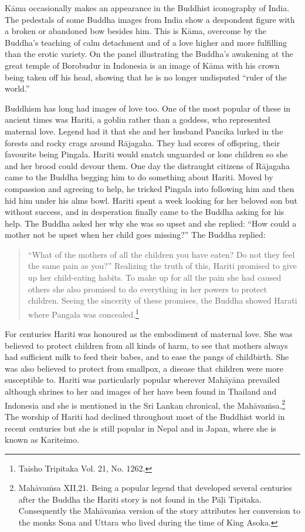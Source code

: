 \documentclass[10pt, openright]{book}
\begin{document}
Kāma occasionally makes an appearance in the Buddhist iconography of India. The pedestals of some Buddha images from India show a despondent figure with a broken or abandoned bow besides him. This is Kāma, overcome by the Buddha’s teaching of calm detachment and of a love higher and more fulfilling than the erotic variety. On the panel illustrating the Buddha’s awakening at the great temple of Borobudur in Indonesia is an image of Kāma with his crown being taken off his head, showing that he is no longer undisputed “ruler of the world.”


Buddhism has long had images of love too. One of the most popular of these in ancient times was Hariti, a goblin rather than a goddess, who represented maternal love. Legend had it that she and her husband Pancika lurked in the forests and rocky crags around Rājagaha. They had scores of offspring, their favourite being Pingala. Hariti would snatch unguarded or lone children so she and her brood could devour them. One day the distraught citizens of Rājagaha came to the Buddha begging him to do something about Hariti. Moved by compassion and agreeing to help, he tricked Pingala into following him and then hid him under his alms bowl. Hariti spent a week looking for her beloved son but without success, and in desperation finally came to the Buddha asking for his help. The Buddha asked her why she was so upset and she replied: “How could a mother not be upset when her child goes missing?” The Buddha replied:


\begin{quote}

\hspace{-0.4em}“What of the mothers of all the children you have eaten? Do not they feel the same pain as you?” Realizing the truth of this, Hariti promised to give up her child-eating habits. To make up for all the pain she had caused others she also promised to do everything in her powers to protect children. Seeing the sincerity of these promises, the Buddha showed Harati where Pangala was concealed.\footnote {Taisho Tripitaka Vol. 21, No. 1262.}


\end{quote}
For centuries Hariti was honoured as the embodiment of maternal love. She was believed to protect children from all kinds of harm, to see that mothers always had sufficient milk to feed their babes, and to ease the pangs of childbirth. She was also believed to protect from smallpox, a disease that children were more susceptible to. Hariti was particularly popular wherever Mahāyāna prevailed although shrines to her and images of her have been found in Thailand and Indonesia and she is mentioned in the Sri Lankan chronical, the Mahāvaṁsa.\footnote {Mahāvaṁsa XII,21. Being a popular legend that developed several centuries after the Buddha the Hariti story is not found in the Pāḷi Tipitaka. Consequently the Mahāvaṁsa version of the story attributes her conversion to the monks Sona and Uttara who lived during the time of King Asoka.} The worship of Hariti had declined throughout most of the Buddhist world in recent centuries but she is still popular in Nepal and in Japan, where she is known as Kariteimo.
\end{document}

